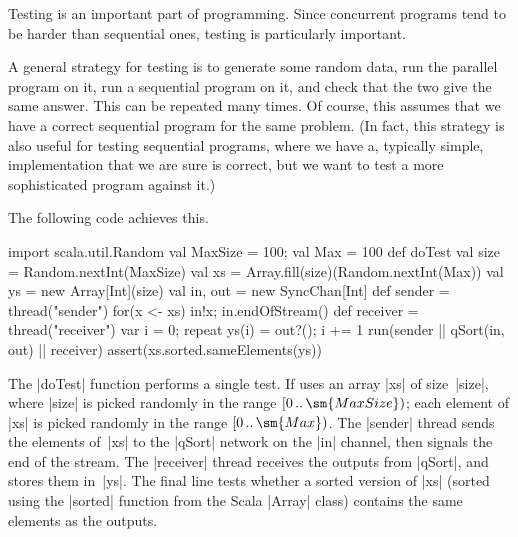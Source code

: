
Testing is an important part of programming.  Since concurrent programs tend
to be harder than sequential ones, testing is particularly important.

A general strategy for testing is to generate some random data, run the
parallel program on it, run a sequential program on it, and check that the two
give the same answer.  This can be repeated many times.  Of course, this
assumes that we have a correct sequential program for the same problem.  (In
fact, this strategy is also useful for testing sequential programs, where we
have a, typically simple, implementation that we are sure is correct, but we
want to test a more sophisticated program against it.)


The following code achieves this.
%
\begin{scala}
  import scala.util.Random
  val MaxSize = 100; val Max = 100
  def doTest{
    val size = Random.nextInt(MaxSize)
    val xs = Array.fill(size)(Random.nextInt(Max))
    val ys = new Array[Int](size)
    val in, out = new SyncChan[Int]
    def sender = thread("sender"){ for(x <- xs) in!x; in.endOfStream() }
    def receiver = thread("receiver"){ var i = 0; repeat{ ys(i) = out?(); i += 1 } }
    run(sender || qSort(in, out) || receiver)
    assert(xs.sorted.sameElements(ys))
  }
\end{scala}
%
The |doTest| function performs a single test.  If uses an array |xs| of
size~|size|, where |size| is picked randomly in the range
$\interval{0}{\sm{MaxSize}}$; each element of |xs| is picked randomly in the
range $\interval{0}{\sm{Max}}$.  The |sender| thread sends the elements
of~|xs| to the |qSort| network on the |in| channel, then signals the end of
the stream.  The |receiver| thread receives the outputs from |qSort|, and
stores them in~|ys|.  The final line tests whether a sorted version of |xs|
(sorted using the |sorted| function from the Scala |Array| class) contains the
same elements as the outputs.

